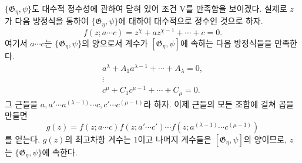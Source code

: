 
$\{\mathfrak G_\eta,\psi\}$도 대수적 정수성에 관하여 닫혀 있어 조건 V를 만족함을 보이겠다. 실제로 $z$가 다음 방정식을 통하여 $\{\mathfrak G_\eta,\psi\}$에 대하여 대수적으로 정수인 것으로 하자.
\[
 f(z;a\cdots c)=z^\chi+a z^{\chi-1}+\cdots+c=0.
\]
여기서 $a\cdots c$는 $\{\mathfrak G_\eta,\psi\}$의 양으로서 계수가 $[\mathfrak G_\eta,\psi]$에 속하는 다음 방정식들을 만족한다.
\[
\begin{gathered}
 a^\lambda+A_1a^{\lambda-1}+\cdots+A_\lambda=0,\\
 \vdots\\
 c^\mu+C_1c^{\mu-1}+\cdots+C_\mu=0.
\end{gathered}
\]
그 근들을 $a,a'\cdots a^{(\lambda-1)}\cdots c,c'\cdots c^{(\mu-1)}$라 하자. 이제 근들의 모든 조합에 걸쳐 곱을 만들면
\[
 g(z)=f(z;a\cdots c)f(z;a'\cdots c')\cdots
      f(z;a^{(\lambda-1)}\cdots c^{(\mu-1)})
\]
를 얻는다. $g(z)$의 최고차항 계수는 $1$이고 나머지 계수들은 $[\mathfrak G_\eta,\psi]$의 양이므로, $z$는 $\{\mathfrak G_\eta,\psi\}$에 속한다.
